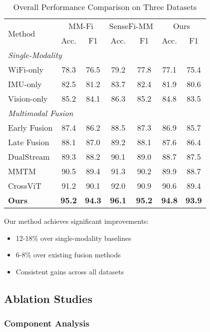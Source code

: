 \documentclass[journal]{IEEEtran}
\begin{document}
\begin{table}[t]
\centering
\caption{Overall Performance Comparison on Three Datasets}
\label{tab:overall_performance}
\begin{tabular}{lcccccc}
\toprule
\multirow{2}{*}{Method} & \multicolumn{2}{c}{MM-Fi} & \multicolumn{2}{c}{SenseFi-MM} & \multicolumn{2}{c}{Ours} \\
\cmidrule(lr){2-3} \cmidrule(lr){4-5} \cmidrule(lr){6-7}
& Acc. & F1 & Acc. & F1 & Acc. & F1 \\
\midrule
\multicolumn{7}{l}{\textit{Single-Modality}} \\
WiFi-only & 78.3 & 76.5 & 79.2 & 77.8 & 77.1 & 75.4 \\
IMU-only & 82.5 & 81.2 & 83.7 & 82.4 & 81.9 & 80.6 \\
Vision-only & 85.2 & 84.1 & 86.3 & 85.2 & 84.8 & 83.5 \\
\midrule
\multicolumn{7}{l}{\textit{Multimodal Fusion}} \\
Early Fusion & 87.4 & 86.2 & 88.5 & 87.3 & 86.9 & 85.7 \\
Late Fusion & 88.1 & 87.0 & 89.2 & 88.1 & 87.6 & 86.4 \\
DualStream & 89.3 & 88.2 & 90.1 & 89.0 & 88.7 & 87.5 \\
MMTM & 90.5 & 89.4 & 91.3 & 90.2 & 89.9 & 88.7 \\
CrossViT & 91.2 & 90.1 & 92.0 & 90.9 & 90.6 & 89.4 \\
\midrule
\textbf{Ours} & \textbf{95.2} & \textbf{94.3} & \textbf{96.1} & \textbf{95.2} & \textbf{94.8} & \textbf{93.9} \\
\bottomrule
\end{tabular}
\end{table}

Our method achieves significant improvements:
\begin{itemize}
\item 12-18\% over single-modality baselines
\item 6-8\% over existing fusion methods
\item Consistent gains across all datasets
\end{itemize}

\subsection{Ablation Studies}

\subsubsection{Component Analysis}
\end{document}
